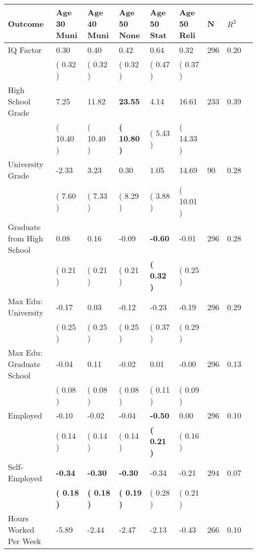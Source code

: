 \begin{tabular}{L{6.2cm} C{1.8cm} C{1.8cm} C{1.8cm} C{1.8cm} C{1.8cm} C{1.8cm} C{0.3cm} C{0.3cm}}
\toprule
 \textbf{Outcome} & \textbf{Age 30 Muni} & \textbf{Age 40 Muni} & \textbf{Age 50 None} & \textbf{Age 50 Stat} & \textbf{Age 50 Reli} & \textbf{N} & \textbf{$ R^2$} \\
\midrule
IQ Factor &      0.30 &      0.40 &      0.42 &      0.64 &      0.32  & 296 &       0.20 \\ 
 & (     0.32 ) & (     0.32 ) & (     0.32 ) & (     0.47 ) & (     0.37 )  & \\
High School Grade &      7.25 &     11.82 & \textbf{    23.55} &      4.14 &     16.61  & 233 &       0.39 \\ 
 & (    10.40 ) & (    10.40 ) & \textbf{(    10.80 )} & (     5.43 ) & (    14.33 )  & \\
University Grade &     -2.33 &      3.23 &      0.30 &      1.05 &     14.69  & 90 &       0.28 \\ 
 & (     7.60 ) & (     7.33 ) & (     8.29 ) & (     3.88 ) & (    10.01 )  & \\
Graduate from High School &      0.08 &      0.16 &     -0.09 & \textbf{    -0.60} &     -0.01  & 296 &       0.28 \\ 
 & (     0.21 ) & (     0.21 ) & (     0.21 ) & \textbf{(     0.32 )} & (     0.25 )  & \\
Max Edu: University &     -0.17 &      0.03 &     -0.12 &     -0.23 &     -0.19  & 296 &       0.29 \\ 
 & (     0.25 ) & (     0.25 ) & (     0.25 ) & (     0.37 ) & (     0.29 )  & \\
Max Edu: Graduate School &     -0.04 &      0.11 &     -0.02 &      0.01 &     -0.00  & 296 &       0.13 \\ 
 & (     0.08 ) & (     0.08 ) & (     0.08 ) & (     0.11 ) & (     0.09 )  & \\
Employed &     -0.10 &     -0.02 &     -0.04 & \textbf{    -0.50} &      0.00  & 296 &       0.10 \\ 
 & (     0.14 ) & (     0.14 ) & (     0.14 ) & \textbf{(     0.21 )} & (     0.16 )  & \\
Self-Employed & \textbf{    -0.34} & \textbf{    -0.30} & \textbf{    -0.30} &     -0.34 &     -0.21  & 294 &       0.07 \\ 
 & \textbf{(     0.18 )} & \textbf{(     0.18 )} & \textbf{(     0.19 )} & (     0.28 ) & (     0.21 )  & \\
Hours Worked Per Week &     -5.89 &     -2.44 &     -2.47 &     -2.13 &     -0.43  & 266 &       0.10 \\ 

\end{tabular}
